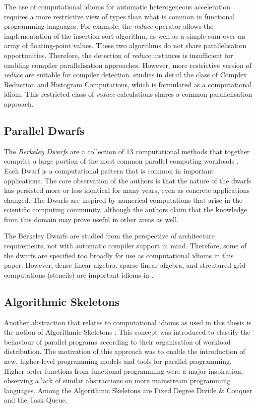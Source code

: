     The use of computational idioms for automatic heterogeneous acceleration
    requires a more restrictive view of types than what is common in
    functional programming languages.
    For example, the {\it reduce} operator allows the implementation of
    the insertion sort algorithm, as well as a simple sum over an array of
    floating-point values.
    These two algorithms do not share parallelisation opportunities.
    Therefore, the detection of {\it reduce} instances is insufficient for
    enabling compiler parallelisation approaches.
    However, more restrictive version of {\it reduce} are suitable for
    compiler detection.
     studies in detail the class of Complex Reduction
    and Histogram Computations, which is formulated as a computational idiom.
    This restricted class of {\it reduce} calculations shares a common
    parallelisation approach.

\subsection{Parallel Dwarfs}

    The {\it Berkeley Dwarfs} are a collection of 13 computational methods
    that together comprise a large portion of the most common parallel computing
    workloads \citep{Asanovic06thelandscape}.
    Each Dwarf is a computational pattern that is common in important
    applications.
    The core observation of the authors is that the nature of the dwarfs has
    persisted more or less identical for many years, even as concrete
    applications changed.
    The Dwarfs are inspired by numerical computations that arise in the
    scientific computing community, although the authors claim that the
    knowledge from this domain may prove useful in other areas as well.

    The Berkeley Dwarfs are studied from the perspective of architecture
    requirements, not with automatic compiler support in mind.
    Therefore, some of the dwarfs are specified too broadly for use as
    computational idioms in this paper.
    However, dense linear algebra, sparse linear algebra, and strcutured grid
    computations (stencils) are important idioms in .

\subsection{Algorithmic Skeletons}

    Another abstraction that relates to computational idioms as used in this
    thesis is the notion of Algorithmic Skeletons \citep{Cole1991Algorithmic}.
    This concept was introduced to classify the behaviour of parallel programs
    according to their organisation of workload distribution.
    The motivation of this approach was to enable the introduction of new,
    higher-level programming models and tools for parallel programming.
    Higher-order functions from functional programming were a major inspiration,
    observing a lack of similar abstractions on more mainstream programming
    languages.
    Among the Algorithmic Skeletons are Fixed Degree Divide \& Conquer and the
    Task Queue.

